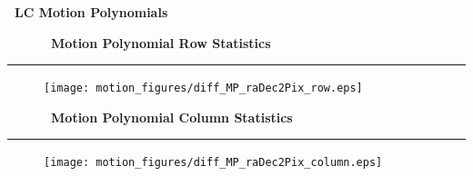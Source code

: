 
\vspace{2in}
\centering
{\Huge {\bf \quarter\ LC Motion Polynomials}}


\cleardoublepage
\begin{figure}[h!]
  \centering
  \hfill
  {\Huge {\bf \quarter\ Motion Polynomial Row Statistics}}
  \hfill
\end{figure}
\hrule

\begin{figure}[h!]
  \centering
  \texttt{[image: motion\_figures/diff\_MP\_raDec2Pix\_row.eps]}
\end{figure}



\cleardoublepage
\begin{figure}[h!]
  \centering
  \hfill
  {\Huge {\bf \quarter\ Motion Polynomial Column Statistics}}
  \hfill
\end{figure}
\hrule

\begin{figure}[h!]
  \centering
  \texttt{[image: motion\_figures/diff\_MP\_raDec2Pix\_column.eps]}
\end{figure}



